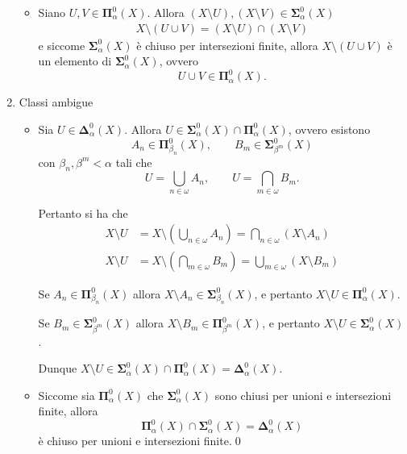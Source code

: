 \documentclass{article}
\newcommand{\1}{\mathds{1}}
\begin{document}
\begin{enumerate}
\begin{itemize}
\item Siano \(U, V \in \bm{\Pi}^0_\alpha(X)\). Allora \((X\setminus U), (X\setminus V) \in \bm{\Sigma}^0_\alpha(X)\)
\begin{align*}
  X\setminus (U\cup V) = (X\setminus U)\cap (X\setminus V)
\end{align*}
e siccome \(\bm{\Sigma}^0_\alpha(X)\) è chiuso per intersezioni finite, allora \(X\setminus (U\cup V)\) è un elemento di \(\bm{\Sigma}^0_\alpha(X)\), ovvero
\begin{equation*}
  U\cup V \in \bm{\Pi}^0_\alpha(X).
\end{equation*}
\end{itemize}
\item Classi ambigue
\label{sec:orgdcf6ba8}

\begin{itemize}
\item Sia \(U \in \bm{\Delta}^0_\alpha(X)\). Allora \(U \in \bm{\Sigma}^0_\alpha(X)\cap \bm{\Pi}^0_\alpha(X)\), ovvero esistono
\begin{equation*}
  A_{n} \in \bm{\Pi}^0_{\beta_{n}}(X),\qquad B_{m} \in \bm{\Sigma}^0_{\beta^{m}}(X)
\end{equation*}
con \(\beta_{n},\beta^{m} <\alpha\) tali che
\begin{equation*}
  U=\bigcup_{n \in \omega} A_{n},\qquad U = \bigcap_{m \in \omega} B_{m}.
\end{equation*}

Pertanto si ha che
\begin{align*}
  X\setminus U &= X \setminus \left(\bigcup_{n \in \omega} A_{n}\right) = \bigcap_{n \in\omega} (X\setminus A_{n})\\
  X\setminus U &= X\setminus \left(\bigcap_{m \in \omega} B_{m}\right) = \bigcup_{m \in \omega} (X\setminus B_{m})
\end{align*}

Se \(A_{n} \in \bm{\Pi}^0_{\beta_{n}}(X)\) allora \(X\setminus A_{n} \in \bm{\Sigma}^0_{\beta_{n}}(X)\), e pertanto \(X\setminus U \in \bm{\Pi}^0_\alpha(X)\).

Se \(B_{m} \in \bm{\Sigma}^0_{\beta^{m}}(X)\) allora \(X\setminus B_{m} \in \bm{\Pi}^0_{\beta^{m}}(X)\), e pertanto \(X\setminus U \in \bm{\Sigma}^0_\alpha(X)\).

Dunque \(X\setminus U \in \bm{\Sigma}^0_\alpha(X)\cap \bm{\Pi}^0_\alpha(X) = \bm{\Delta}^0_\alpha(X)\).

\item Siccome sia \(\bm{\Pi}^0_\alpha(X)\) che \(\bm{\Sigma}^0_\alpha(X)\) sono chiusi per unioni e intersezioni finite, allora
\[
  \bm{\Pi}^0_\alpha(X)\cap \bm{\Sigma}^0_\alpha(X) = \bm{\Delta}^0_\alpha(X)
  \]
è chiuso per unioni e intersezioni finite.\qed
\end{itemize}
\end{enumerate}
\end{document}
